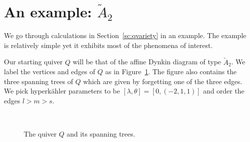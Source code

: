\documentclass{amsart}
\theoremstyle{definition}
\begin{document}
\section{An example: $\widetilde{A}_2$} \label{sc:example}

We go through calculations in Section~\ref{sc:qvariety} in an example.
The example is relatively simple yet it exhibits most of the phenomena of interest.

Our starting quiver $Q$ will be that of the affine Dynkin diagram of type $\widetilde{A}_2$.
We label the vertices and edges of $Q$ as in Figure~\ref{fig:A_2graph}.
The figure also contains the three spanning trees of $Q$ which are given by forgetting one of the three edges.
We pick hyperk\"ahler parameters to be $[\lambda,\theta] = [0,(-2,1,1)]$ and order the edges $l>m>s$. 
\begin{figure}[H]
\centering
{}
\\
\quad \quad
{} \quad \quad
{}
\caption{The quiver $Q$ and its spanning trees.}\label{fig:A_2graph}
\end{figure}
\end{document}
